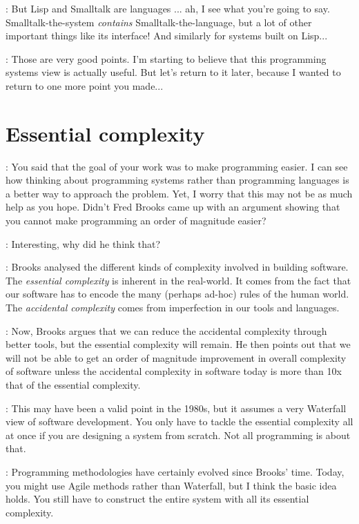 \documentclass[runningheads]{llncs}
\newcommand{\T}{Tomas}
\newcommand{\J}{Joel}
\newcommand{\says}[2][gg]{\vspace{0.5em}\noindent\hangindent=0.5cm{\textsc{#1}}: #2}
\begin{document}
\says[\T]{But Lisp and Smalltalk are languages ... ah, I see what you're going to say. Smalltalk-the-system \emph{contains} Smalltalk-the-language, but a lot of other important things like its interface! And similarly for systems built on Lisp...}

\says[\T]{Those are very good points. I'm starting to believe that this programming systems view is actually useful. But let's return to it later, because I wanted to return to one more point you made...}

\section{Essential complexity}

\says[\T]{You said that the goal of your work was to make programming easier. I can see how thinking about programming systems rather than programming languages is a better way to approach the problem. Yet, I worry that this may not be as much help as you hope. Didn't Fred Brooks came up with an argument showing that you cannot make programming an order of magnitude easier?}

\says[\J]{Interesting, why did he think that?}

\says[\T]{Brooks \cite{brooks-1987-silver} analysed the different kinds of complexity involved in building software. The \emph{essential complexity} is inherent in the real-world. It comes from the fact that our software has to encode the many (perhaps ad-hoc) rules of the human world. The \emph{accidental complexity} comes from imperfection in our tools and languages.}

\says[\T]{Now, Brooks argues that we can reduce the accidental complexity through better tools, but the essential complexity will remain. He then points out that we will not be able to get an order of magnitude improvement in overall complexity of software unless the accidental complexity in software today is more than 10x that of the essential complexity.}

\says[\J]{This may have been a valid point in the 1980s, but it assumes a very Waterfall view of software development. You only have to tackle the essential complexity all at once if you are designing a system from scratch. Not all programming is about that.}

\says[\T]{Programming methodologies have certainly evolved since Brooks' time. Today, you might use Agile methods rather than Waterfall, but I think the basic idea holds. You still have to construct the entire system with all its essential complexity.}
\end{document}
